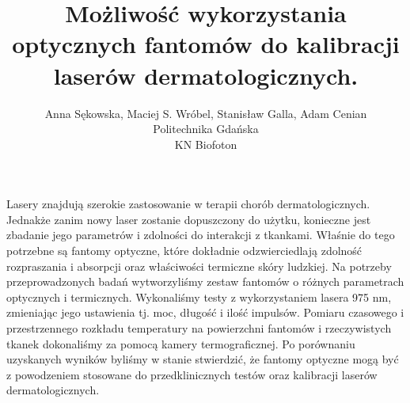 \documentclass[12pt, a4paper]{article}
\begin{document}
\title{Możliwość wykorzystania optycznych fantomów do kalibracji laserów dermatologicznych.}
\author{Anna Sękowska, Maciej S. Wróbel, Stanisław Galla, Adam Cenian \\Politechnika Gdańska\\ KN Biofoton}
\date {}
\maketitle
\thispagestyle{title}
Lasery znajdują szerokie zastosowanie w terapii chorób dermatologicznych. Jednakże zanim nowy laser zostanie dopuszczony do użytku, konieczne jest zbadanie jego parametrów i zdolności do interakcji z tkankami. Właśnie do tego potrzebne są fantomy optyczne, które dokładnie odzwierciedlają zdolność rozpraszania i absorpcji oraz właściwości termiczne skóry ludzkiej. Na potrzeby przeprowadzonych badań wytworzyliśmy zestaw fantomów o różnych parametrach optycznych i termicznych. Wykonaliśmy testy z wykorzystaniem lasera 975 nm, zmieniając jego ustawienia tj. moc, długość i ilość impulsów. Pomiaru czasowego i przestrzennego rozkładu temperatury na powierzchni fantomów i rzeczywistych tkanek dokonaliśmy za pomocą kamery termograficznej. Po porównaniu uzyskanych wyników byliśmy w stanie stwierdzić, że fantomy optyczne mogą być z powodzeniem stosowane do przedklinicznych testów oraz kalibracji laserów dermatologicznych.
\end{document}
